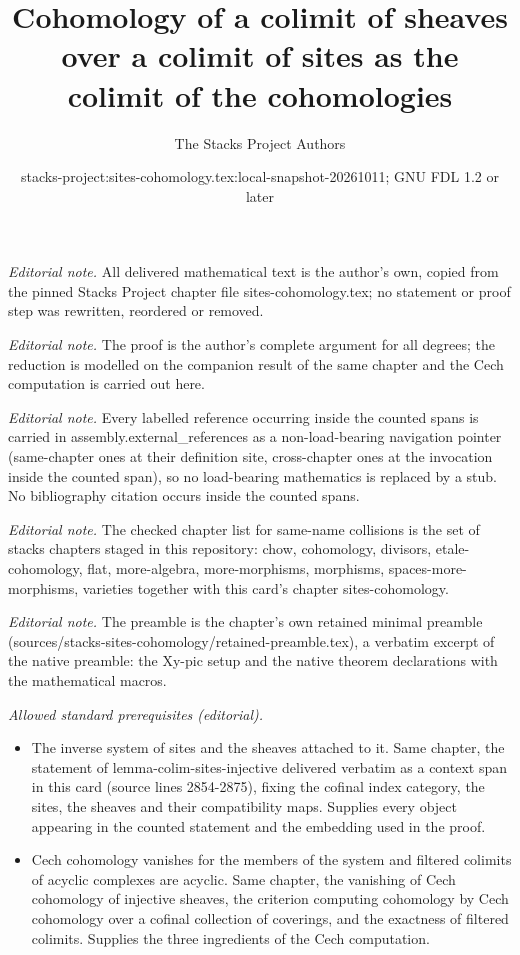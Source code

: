 \documentclass[10pt,a4paper]{amsart}
\title{Cohomology of a colimit of sheaves over a colimit of sites as the colimit of the cohomologies}
\author{The Stacks Project Authors}
\date{stacks-project:sites-cohomology.tex:local-snapshot-20261011; GNU FDL 1.2 or later}
\theoremstyle{plain}
\theoremstyle{definition}
\theoremstyle{remark}
\numberwithin{equation}{subsection}
\begin{document}
\maketitle
\noindent\textit{Editorial note.} All delivered mathematical text is the author's own, copied from the pinned Stacks Project chapter file sites-cohomology.tex; no statement or proof step was rewritten, reordered or removed.\par\medskip
\noindent\textit{Editorial note.} The proof is the author's complete argument for all degrees; the reduction is modelled on the companion result of the same chapter and the Cech computation is carried out here.\par\medskip
\noindent\textit{Editorial note.} Every labelled reference occurring inside the counted spans is carried in assembly.external\_references as a non-load-bearing navigation pointer (same-chapter ones at their definition site, cross-chapter ones at the invocation inside the counted span), so no load-bearing mathematics is replaced by a stub. No bibliography citation occurs inside the counted spans.\par\medskip
\noindent\textit{Editorial note.} The checked chapter list for same-name collisions is the set of stacks chapters staged in this repository: chow, cohomology, divisors, etale-cohomology, flat, more-algebra, more-morphisms, morphisms, spaces-more-morphisms, varieties together with this card's chapter sites-cohomology.\par\medskip
\noindent\textit{Editorial note.} The preamble is the chapter's own retained minimal preamble (sources/stacks-sites-cohomology/retained-preamble.tex), a verbatim excerpt of the native preamble: the Xy-pic setup and the native theorem declarations with the mathematical macros.\par\medskip
\noindent\textit{Allowed standard prerequisites (editorial).}\begin{itemize}
\item The inverse system of sites and the sheaves attached to it. Same chapter, the statement of lemma-colim-sites-injective delivered verbatim as a context span in this card (source lines 2854-2875), fixing the cofinal index category, the sites, the sheaves and their compatibility maps. Supplies every object appearing in the counted statement and the embedding used in the proof.
\item Cech cohomology vanishes for the members of the system and filtered colimits of acyclic complexes are acyclic. Same chapter, the vanishing of Cech cohomology of injective sheaves, the criterion computing cohomology by Cech cohomology over a cofinal collection of coverings, and the exactness of filtered colimits. Supplies the three ingredients of the Cech computation.
\end{itemize}\medskip
\end{document}
